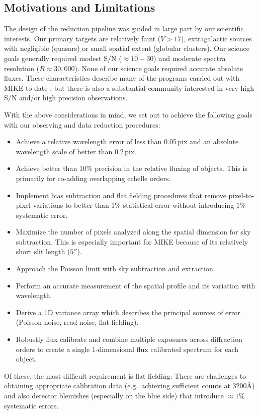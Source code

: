 \documentclass[]{emulateapj}
\begin{document}
\subsection{Motivations and Limitations}

The design of the reduction pipeline was guided in large
part by our scientific interests.  Our primary targets are
relatively faint ($V>17$), extragalactic sources with negligible
(quasars) or small spatial extent (globular clusters).
Our science goals generally required modest S/N ($\approx 10-30$)
and moderate spectra resolution ($R\approx 30,000$). 
None of our science goals required accurate absolute fluxes.
These characteristics describe many of the programs carried
out with MIKE to date \citep[e.g.][]{cpb+05,mlk+07,dab+07,fpl+08},
but there is also a substantial community interested in very
high S/N and/or high precision observations.

With the above considerations in mind, we set out to achieve
the following goals with our observing and data reduction
procedures:

\begin{itemize}

\item  Achieve a relative wavelength error of less than 0.05\,pix
and an absolute wavelength scale of better than 0.2\,pix.

\item  Achieve better than 10$\%$ precision in the relative fluxing
of objects.  This is primarily  for co-adding 
overlapping echelle orders.

\item  Implement bias subtraction and flat fielding procedures
that remove pixel-to-pixel variations to better than 1$\%$ statistical
error without introducing $1\%$ systematic error.

\item  Maximize the number of pixels analyzed along the spatial 
dimension for sky subtraction.  This is especially important for MIKE
because of its relatively short slit length ($5''$).

\item  Approach the Poisson limit with sky subtraction and extraction.

\item  Perform an accurate measurement of the spatial profile and
its variation with wavelength.

\item  Derive a 1D variance array which describes the principal sources
of error (Poisson noise, read noise, flat fielding).

\item  Robustly flux calibrate and combine multiple exposures across
diffraction orders to create a single 1-dimensional flux calibrated 
spectrum for each object.

\end{itemize}
Of these, the most difficult requirement is flat fielding:
There are challenges to obtaining appropriate calibration data 
(e.g.\ achieving sufficient counts at 3200\AA) and also
detector blemishes (especially on the blue side) 
that introduce $\approx 1\%$ systematic errors.
\end{document}

